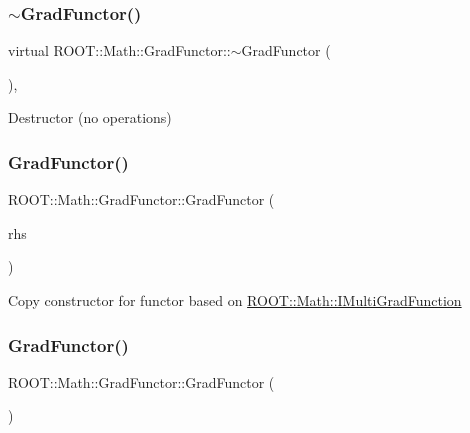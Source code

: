 \subsubsection{\texorpdfstring{$\sim$GradFunctor()}{~GradFunctor()}\hspace{0.1cm}{\footnotesize\ttfamily [1/3]}}
{\footnotesize\ttfamily virtual R\+O\+O\+T\+::\+Math\+::\+Grad\+Functor\+::$\sim$\+Grad\+Functor (\begin{DoxyParamCaption}{ }\end{DoxyParamCaption})\hspace{0.3cm}{\ttfamily [inline]}, {\ttfamily [virtual]}}

Destructor (no operations) \mbox{\label{classROOT_1_1Math_1_1GradFunctor_a629b55d9f326dbf39e5c3ccfb4678579}} 
\subsubsection{\texorpdfstring{GradFunctor()}{GradFunctor()}\hspace{0.1cm}{\footnotesize\ttfamily [5/15]}}
{\footnotesize\ttfamily R\+O\+O\+T\+::\+Math\+::\+Grad\+Functor\+::\+Grad\+Functor (\begin{DoxyParamCaption}\item[{const \mbox{\hyperlink{classROOT_1_1Math_1_1GradFunctor}{Grad\+Functor}} \&}]{rhs }\end{DoxyParamCaption})\hspace{0.3cm}{\ttfamily [inline]}}

Copy constructor for functor based on \mbox{\hyperlink{namespaceROOT_1_1Math_a014e019aaf9304a00e9231bd9ed232fb}{R\+O\+O\+T\+::\+Math\+::\+I\+Multi\+Grad\+Function}} \mbox{\label{classROOT_1_1Math_1_1GradFunctor_a68c75192981688e292ee84be652a8ec4}} 
\subsubsection{\texorpdfstring{GradFunctor()}{GradFunctor()}\hspace{0.1cm}{\footnotesize\ttfamily [6/15]}}
{\footnotesize\ttfamily R\+O\+O\+T\+::\+Math\+::\+Grad\+Functor\+::\+Grad\+Functor (\begin{DoxyParamCaption}{ }\end{DoxyParamCaption})\hspace{0.3cm}{\ttfamily [inline]}}

